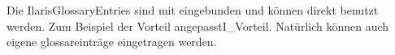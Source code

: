 \documentclass{Ilaris}
\begin{document}
Die IlarisGlossaryEntries sind mit eingebunden und können direkt benutzt werden. Zum Beispiel der Vorteil \gls{angepasstI_Vorteil}. Natürlich können auch eigene
\gls{glossareinträge} eingetragen werden.
\spaltenende

\renewcommand*{\glossarysection}[2][]{%
    \twocolumn[{\chapter*{#2}}]%
    \setlength\glsdescwidth{0.6\linewidth}%
    \glsglossarymark{\glossarytoctitle}%
}
\renewcommand*{\glossarypostamble}{\onecolumn}




\glossar
\end{document}
